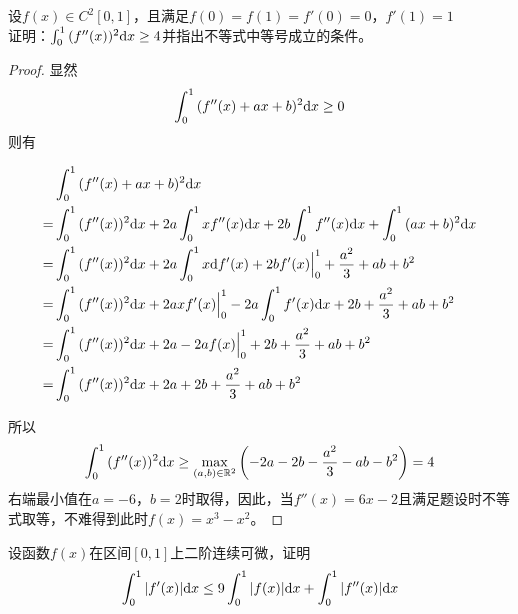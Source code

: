 \begin{proposition}

    设$f(x) \in C^2[0,1]$，且满足$f(0) = f(1) = f'(0) = 0$，$f'(1) = 1$\\
    证明：$\int_{0}^{1}{(f''(x))^2}\mathrm{d} x \geq 4$并指出不等式中等号成立的条件。

\end{proposition}

\begin{proof}

    显然
    $$\int_{0}^{1}{(f''(x) + ax + b)^2}\mathrm{d} x \geq 0$$
    则有

    \begin{align*}
        & \int_{0}^{1}{(f''(x) + ax + b)^2}\mathrm{d} x \\
        = & \int_{0}^{1}{(f''(x))^2}\mathrm{d} x + 2a \int_{0}^{1}{xf''(x)}\mathrm{d} x + 2b \int_{0}^{1}{f''(x)}\mathrm{d} x + \int_{0}^{1}{(ax + b)^2}\mathrm{d} x \\
        = & \int_{0}^{1}{(f''(x))^2}\mathrm{d} x + 2a \int_{0}^{1}{x}\mathrm{d} f'(x) + 2b f'(x) \Big|_{0}^{1} + \dfrac{a^2}{3} + ab + b^2 \\
        = & \int_{0}^{1}{(f''(x))^2}\mathrm{d} x + 2a xf'(x)\Big|_{0}^{1} - 2a \int_{0}^{1}{f'(x)}\mathrm{d} x + 2b + \dfrac{a^2}{3} + ab + b^2 \\
        = & \int_{0}^{1}{(f''(x))^2}\mathrm{d} x + 2a - 2af(x)\Big|_{0}^{1} + 2b + \dfrac{a^2}{3} + ab + b^2 \\
        = & \int_{0}^{1}{(f''(x))^2}\mathrm{d} x + 2a + 2b + \dfrac{a^2}{3} + ab + b^2
    \end{align*}

    所以
    $$\int_{0}^{1}{(f''(x))^2}\mathrm{d} x \geq \max_{(a,b) \in \mathbb{R}^2}\left(-2a - 2b - \dfrac{a^2}{3} - ab - b^2 \right) = 4$$
    右端最小值在$a = -6$，$b = 2$时取得，因此，当$f''(x) = 6x - 2$且满足题设时不等式取等，不难得到此时$f(x) = x^3 - x^2$。
    
\end{proof}

\begin{proposition}

    设函数$f(x)$在区间$[0,1]$上二阶连续可微，证明
    $$\int_{0}^{1}{|f'(x)|}\mathrm{d} x \leq 9\int_{0}^{1}{|f(x)|}\mathrm{d} x + \int_{0}^{1}{|f''(x)|}\mathrm{d} x$$

\end{proposition}

